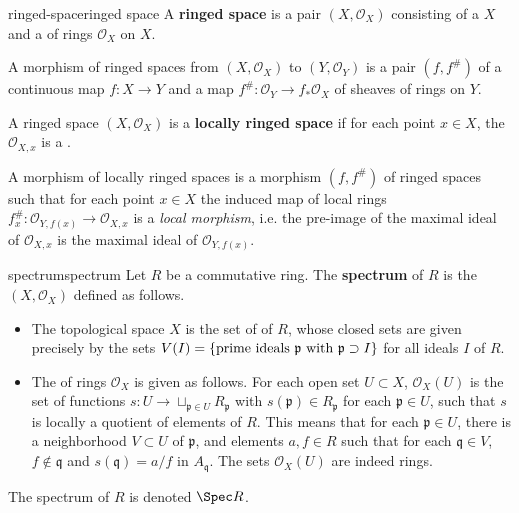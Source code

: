 \begin{topic}{ringed-space}{ringed space}
    A \textbf{ringed space} is a pair $(X, \mathcal{O}_X)$ consisting of a  $X$ and a  of rings $\mathcal{O}_X$ on $X$.
    
    A morphism of ringed spaces from $(X, \mathcal{O}_X)$ to $(Y, \mathcal{O}_Y)$ is a pair $(f, f^\#)$ of a continuous map $f : X \to Y$ and a map $f^\# : \mathcal{O}_Y \to f_* \mathcal{O}_X$ of sheaves of rings on $Y$.
    
    A ringed space $(X, \mathcal{O}_X)$ is a \textbf{locally ringed space} if for each point $x \in X$, the  $\mathcal{O}_{X,x}$ is a .
    
    A morphism of locally ringed spaces is a morphism $(f, f^\#)$ of ringed spaces such that for each point $x \in X$ the induced map of local rings $f^\#_x : \mathcal{O}_{Y, f(x)} \to \mathcal{O}_{X, x}$ is a \textit{local morphism}, i.e. the pre-image of the maximal ideal of $\mathcal{O}_{X, x}$ is the maximal ideal of $\mathcal{O}_{Y, f(x)}$.
\end{topic}

\begin{topic}{spectrum}{spectrum}
    Let $R$ be a commutative ring. The \textbf{spectrum} of $R$ is the  $(X, \mathcal{O}_X)$ defined as follows.
    \begin{itemize}
        \item The topological space $X$ is the set of  of $R$, whose closed sets are given precisely by the sets $V(I) = \{ \textup{prime ideals } \mathfrak{p} \text{ with } \mathfrak{p} \supset I \}$ for all ideals $I$ of $R$.
        
        \item The  of rings $\mathcal{O}_X$ is given as follows. For each open set $U \subset X$, $\mathcal{O}_X(U)$ is the set of functions $s : U \to \sqcup_{\mathfrak{p} \in U} R_\mathfrak{p}$ with $s(\mathfrak{p}) \in R_\mathfrak{p}$ for each $\mathfrak{p} \in U$, such that $s$ is locally a quotient of elements of $R$. This means that for each $\mathfrak{p} \in U$, there is a neighborhood $V \subset U$ of $\mathfrak{p}$, and elements $a, f \in R$ such that for each $\mathfrak{q} \in V$, $f \not\in \mathfrak{q}$ and $s(\mathfrak{q}) = a/f$ in $A_\mathfrak{q}$. The sets $\mathcal{O}_X(U)$ are indeed rings.
    \end{itemize}
    The spectrum of $R$ is denoted $\Spec R$.
\end{topic}

